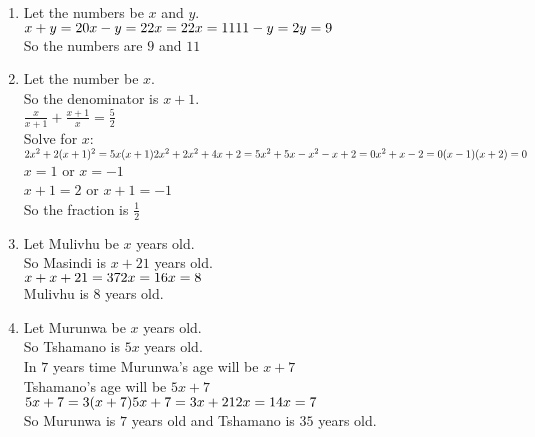 \begin{solutions}{}
{\begin{enumerate}[itemsep=10pt, label=\textbf{\arabic*}. ]
\item Let the numbers be $x$ and $y$.\\
$x+y=20\\
x-y=2\\
2x=22\\
x=11\\
11-y=2\\
y=9$\\
So the numbers are $9$ and $11$
\item Let the number be $x$.\\
So the denominator is $x+1$.\\
$\frac{x}{x+1}+\frac{x+1}{x}=\frac{5}{2}$\\
Solve for $x$:\\
$2x^2+2(x+1)^2=5x(x+1)\\
2x^2+2x^2+4x+2=5x^2+5x\\
-x^2-x+2=0\\
x^2+x-2=0\\
(x-1)(x+2)=0$\\
$x=1$ or $x=-1$\\
$x+1=2$ or $x+1=-1$\\
So the fraction is $\frac{1}{2}$ 
\item Let Mulivhu be $x$ years old.\\
So Masindi is $x+21$ years old.\\
$x+x+21=37\\
2x=16\\
x=8$\\
Mulivhu is $8$ years old.
\item Let Murunwa be $x$ years old.\\
So Tshamano is $5x$ years old.\\
In $7$ years time Murunwa's age will be $x+7$\\
Tshamano's age will be $5x+7$\\
$5x+7=3(x+7)\\
5x+7=3x+21\\
2x=14\\
x=7$\\
So Murunwa is $7$ years old and Tshamano is $35$ years old.
\end{enumerate}}
\end{solutions}


